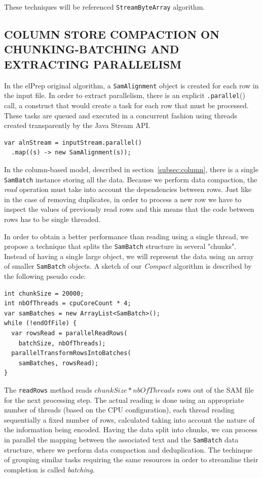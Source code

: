 \documentclass[a4paper,twoside]{article}
\begin{document}
These techniques will be referenced \texttt{StreamByteArray} algorithm.

\subsection{\uppercase{Column Store Compaction on Chunking-Batching and Extracting Parallelism}} 
\label{subsec:batching}

In the elPrep original algorithm, a {\texttt{SamAlignment}} object is created for each row in the input file.
In order to extract parallelism, there is an explicit {\texttt{.parallel}()} call, a construct that would create a task for each row that must be processed.
These tasks are queued and executed in a concurrent fashion using threads created transparently by the Java Stream API.
\begin{verbatim}
var alnStream = inputStream.parallel()
  .map((s) -> new SamAlignment(s));
\end{verbatim}
In the column-based model, described in section~\ref{subsec:column}, there is a single {\texttt{SamBatch}} instance storing all the data.
Because we perform data compaction, the {\textit{read}} operation must take into account the dependencies between rows. Just like in the case of removing duplicates, in order to process a new row we have to inspect the values of previously read rows and this means that the code between rows has to be single threaded.

In order to obtain a better performance than reading using a single thread, we propose a technique that splits the {\texttt{SamBatch}} structure in several "chunks".
Instead of having a single large object, we will represent the data using an array of smaller {\texttt{SamBatch}} objects.
A sketch of our {\textit{Compact}} algorithm is described by the following pseudo code:

\begin{verbatim}
int chunkSize = 20000;
int nbOfThreads = cpuCoreCount * 4;
var samBatches = new ArrayList<SamBatch>();
while (!endOfFile) {
  var rowsRead = parallelReadRows(
    batchSize, nbOfThreads);
  parallelTransformRowsIntoBatches(
    samBatches, rowsRead);
}
\end{verbatim}

The {\texttt{readRows}} method reads $chunkSize * nbOfThreads$ rows out of the SAM file for the next processing step.
The actual reading is done using an appropriate number of threads (based on the CPU configuration), each thread reading sequentially a fixed number of rows, calculated taking into account the nature of the information being encoded.
Having the data split into chunks, we can process in parallel the mapping between the associated text and the {\texttt{SamBatch}} data structure, where we perform data compaction and deduplication.
The techinque of grouping similar tasks requiring the same resources in order to streamline their completion is called {\textit{batching}}.
\end{document}
